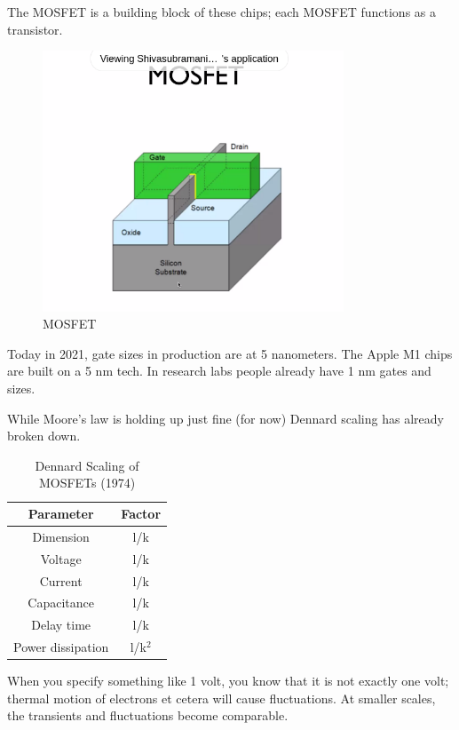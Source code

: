 \documentclass[a4paper]{article}
\begin{document}
The MOSFET is a building block of these chips; each MOSFET functions
as a transistor.

\begin{figure}[h]
	\centering
	\includegraphics[width=0.8\textwidth]{figures/mosfet.png}
	\caption{MOSFET}
	\label{fig:figures-mosfet-png}
\end{figure}

Today in 2021, gate sizes in production are at 5 nanometers. The 
Apple M1 chips are built on a 5 nm tech. In research labs people 
already have 1 nm gates and sizes.

While Moore's law is holding up just fine (for now) Dennard scaling
has already broken down.

\begin{table}[h]
	\centering
	\caption{Dennard Scaling of MOSFETs (1974)}
	\label{tab:dennard}
	\begin{tabular}{c c}
	 Parameter & Factor\\
	 \hline
	 Dimension & l/k\\
	 Voltage & l/k\\
	 Current & l/k\\
	 Capacitance & l/k\\
	 Delay time & l/k \\
	 Power dissipation & l/k$^2$
	\end{tabular}
\end{table}

When you specify something like 1 volt, you know that it is not
exactly one volt; thermal motion of electrons et cetera will cause
fluctuations. At smaller scales, the transients and fluctuations
become comparable. 
\end{document}
